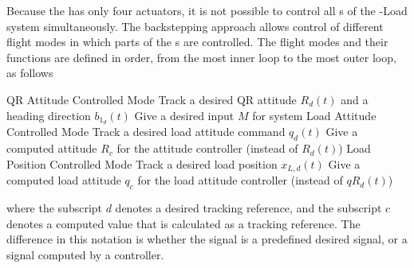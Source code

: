 %

Because the  has only four actuators, it is not possible to control all s of the -Load system simultaneously. The backstepping approach allows control of different flight modes in which parts of the s are controlled. The flight modes and their functions are defined in order, from the most inner loop to the most outer loop, as follows
\begin{outline}
\1 QR Attitude Controlled Mode 
\2 Track a desired QR attitude $ R_d(t) $ and a heading direction $ b_{1_d}(t) $
\2 Give a desired input $ M $ for system
\1 Load Attitude Controlled Mode 
\2 Track a desired load attitude command $ q_d(t) $
\2 Give a computed  attitude $ R_c $ for the  attitude controller (instead of $ R_d(t) $)
\1 Load Position Controlled Mode
\2 Track a desired load position $ x_{L,d}(t) $
\2 Give a computed load attitude $ q_c $ for the load attitude controller (instead of $qR_d(t) $)
\end{outline}
where the subscript $d $ denotes a desired tracking reference, and the subscript $ c $ denotes a computed value that is calculated as a tracking reference. The difference in this notation is whether the signal is a predefined desired signal, or a signal computed by a controller.

